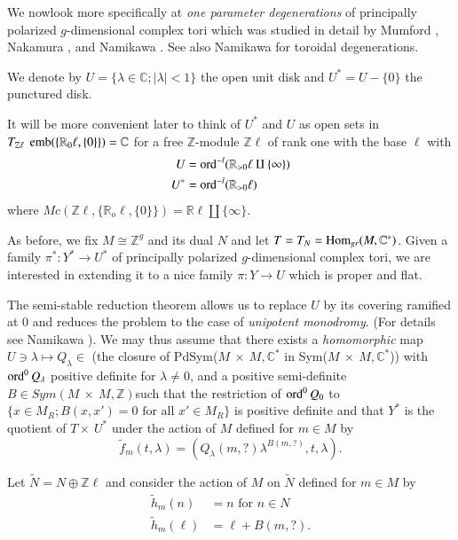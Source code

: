  We now\pageoriginale look more specifically at \textit{one parameter
   degenerations} of principally polarized $g$-dimensional complex
 tori which was studied in detail by Mumford \cite{keyM7}, Nakamura 
 \cite{keyN3},  \cite{keyN4} and Namikawa \cite[\S.~17]{keyN5}. See
 also Namikawa \cite{keyN6} for 
 toroidal degenerations.  

\begin{defi*}
We denote by $U = \{ \lambda \in \mathbb{C} ; | \lambda | < 1\}$ the
open unit disk and $U^* = U - \{ 0 \}$ the punctured disk. 
\end{defi*}

It will be more convenient later to think of $U^*$ and $U$ as open
sets in $T_{\mathbb{Z} \ell } ~\operatorname{emb} (\{\mathbb{R}_0 \ell, \{ 0 \} \})=
\mathbb{C}$ for a free $\mathbb{Z}$-module $\mathbb{Z}\ell$ of rank
one with the base $\ell$ with 
\begin{align*}
U & = \operatorname{ord}^{-l} (\mathbb{R}_{>0} \ell \amalg \{ \infty \} )\\
U^* & = \operatorname{ord}^{-l} ( \mathbb{R}_{>0} \ell )
\end{align*}
where $Mc(\mathbb{Z}\ell, \{ \mathbb{R}_o \ell,\{0\}\}) =
\mathbb{R}\ell \amalg \{\infty\}$.  

As before, we fix $M \cong \mathbb{Z}^g$ and its dual $N$ and let $T =
T_N = \operatorname{Hom}_{gr}(M,\mathbb{C}^*)$. Given a family $\pi^* : Y^*
\rightarrow U^*$ of principally polarized $g$-dimensional complex tori,
we are interested in extending it to a nice family $\pi : Y
\rightarrow U$ which is proper and flat. 

The semi-stable reduction theorem allows us to replace $U$ by its
covering ramified at 0 and reduces the problem to the case of
\textit{unipotent monodromy}. (For details see Namikawa
\cite[\S. 17]{keyN5}). We may thus assume that there exists a 
\textit{homomorphic} map $U \ni \lambda \longmapsto Q_{\lambda} \in $
(the closure of PdSym($M~ \times~ M, \mathbb{C}^*$ in Sym($M~ \times~ M,
\mathbb{C}^*$)) with $\operatorname{ord}^0Q_{\lambda}$ positive definite for $\lambda
\neq 0$, and a positive semi-definite $B \in  Sym(M ~ \times ~M,
\mathbb{Z})$\pageoriginale such that the restriction of $\operatorname{ord}^0 Q_0$
to $\{ x \in M_R 
; B(x,x') = 0 \text{ for all } x' \in M_R \}$ is positive definite and
that $Y^*$ is the quotient of $T \times ~U^*$ under the action of $M$
defined for $m \in M$ by 
$$
\tilde{f}_m (t,\lambda) = (Q_\lambda(m,?)\lambda^{B(m,?)},t,\lambda). 
$$

Let $\tilde{N} = N \oplus \mathbb{Z}\ell $ and consider the action of
$M$ on $\tilde{N}$ defined for $m\in M $ by  
\begin{align*}
\tilde{h}_m(n) & = n \text{ for } n\in N\\
\tilde{h}_m(\ell) & = \ell + B(m,?).
\end{align*}

